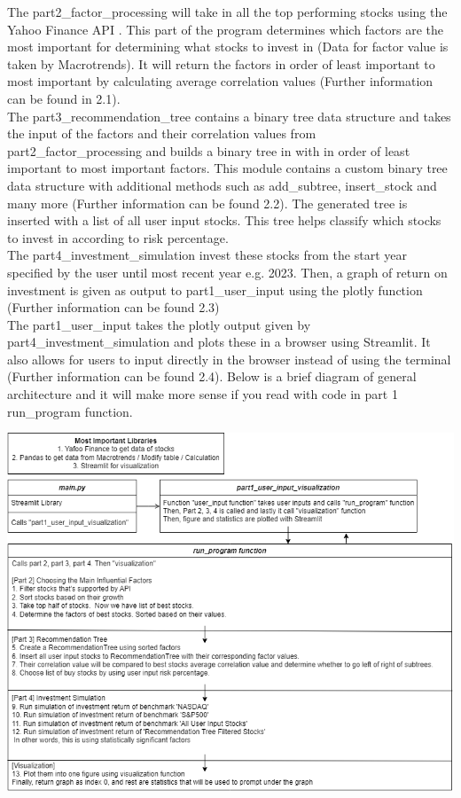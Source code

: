\documentclass[fontsize=11pt]{article}
\begin{document}
The part2\_factor\_processing will take in all the top performing stocks using the Yahoo Finance API \cite{jecsandyahoo}. This part of the program determines which factors are the most important for determining what stocks to invest in (Data for factor value is taken by Macrotrends). It will return the factors in order of least important to most important by calculating average correlation values (Further information can be found in 2.1).\\

The part3\_recommendation\_tree contains a binary tree data structure and takes the input of the factors and their correlation values from part2\_factor\_processing and builds a binary tree in with in order of least important to most important factors. This module contains a custom binary tree data structure with additional methods such as add\_subtree, insert\_stock and many more (Further information can be found 2.2). The generated tree is inserted with a list of all user input stocks. This tree helps classify which stocks to invest in according to risk percentage. \\

The part4\_investment\_simulation invest these stocks from the start year specified by the user until most recent year e.g. 2023. Then, a graph of return on investment is given as output to part1\_user\_input using the plotly function (Further information can be found 2.3) \\

The part1\_user\_input takes the plotly output given by part4\_investment\_simulation and plots these in a browser using Streamlit. It also allows for users to input directly in the browser instead of using the terminal (Further information can be found 2.4). Below is a brief diagram of general architecture and it will make more sense if you read with code in part 1 run\_program function.

\begin{center}
\includegraphics[scale=0.5]{CSC111.drawio.png}
\end{center}
\end{document}
